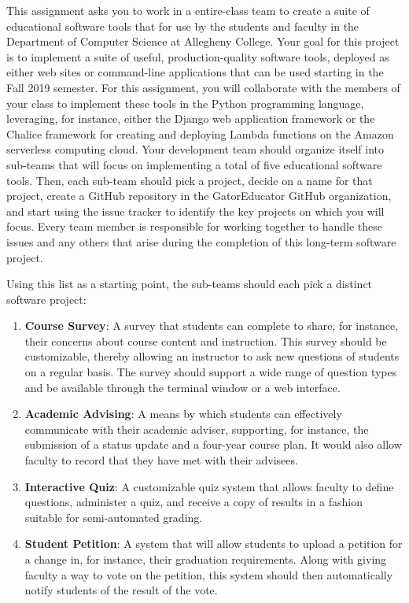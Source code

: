 \documentclass[11pt]{article}
\begin{document}

This assignment asks you to work in a entire-class team to create a suite of
educational software tools that for use by the students and faculty in the
Department of Computer Science at Allegheny College. Your goal for this project
is to implement a suite of useful, production-quality software tools, deployed
as either web sites or command-line applications that can be used starting in
the Fall 2019 semester.
%
For this assignment, you will collaborate with the members of your class to
implement these tools in the Python programming language, leveraging, for
instance, either the Django web application framework or the Chalice framework
for creating and deploying Lambda functions on the Amazon serverless computing
cloud.
%
Your development team should organize itself into sub-teams that will focus on
implementing a total of five educational software tools.
%
Then, each sub-team should pick a project, decide on a name for that project,
create a GitHub repository in the GatorEducator GitHub organization, and start
using the issue tracker to identify the key projects on which you will focus.
%
Every team member is responsible for working together to handle these issues and
any others that arise during the completion of this long-term software project.

Using this list as a starting point, the sub-teams should each pick a distinct
software project:

\vspace*{-.1in}

\begin{enumerate}
  \setlength{\itemsep}{0pt}

  \item {\bf Course Survey}: A survey that students can complete to share, for
    instance, their concerns about course content and instruction. This survey
    should be customizable, thereby allowing an instructor to ask new questions
    of students on a regular basis. The survey should support a wide range of
    question types and be available through the terminal window or a web
    interface.

  \item {\bf Academic Advising}: A means by which students can effectively
    communicate with their academic adviser, supporting, for instance, the
    submission of a status update and a four-year course plan. It would also
    allow faculty to record that they have met with their advisees.

  \item {\bf Interactive Quiz}: A customizable quiz system that allows faculty
    to define questions, administer a quiz, and receive a copy of results in a
    fashion suitable for semi-automated grading.

  \item {\bf Student Petition}: A system that will allow students to upload a
    petition for a change in, for instance, their graduation requirements. Along
    with giving faculty a way to vote on the petition, this system should then
    automatically notify students of the result of the vote.

\end{enumerate}
\end{document}
